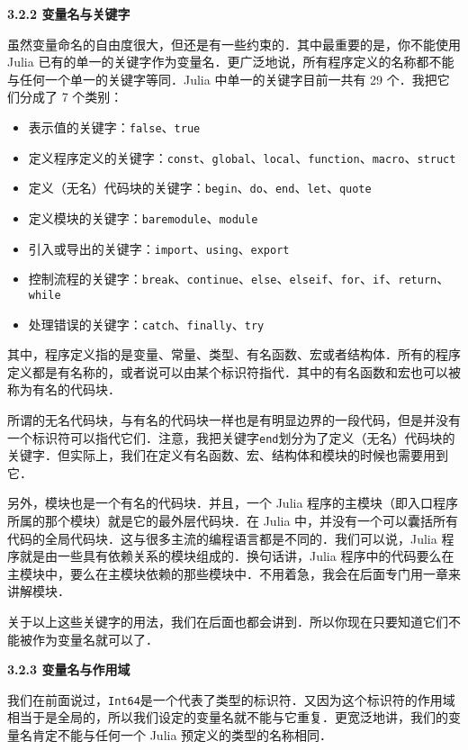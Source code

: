 \textbf{3.2.2 变量名与关键字}

虽然变量命名的自由度很大，但还是有一些约束的．其中最重要的是，你不能使用 Julia 已有的单一的关键字作为变量名．更广泛地说，所有程序定义的名称都不能与任何一个单一的关键字等同．Julia 中单一的关键字目前一共有 29 个．我把它们分成了 7 个类别：

\begin{itemize}
\item 表示值的关键字：\verb|false|、\verb|true|
\item 定义程序定义的关键字：\verb|const|、\verb|global|、\verb|local|、\verb|function|、\verb|macro|、\verb|struct|
\item 定义（无名）代码块的关键字：\verb|begin|、\verb|do|、\verb|end|、\verb|let|、\verb|quote|
\item 定义模块的关键字：\verb|baremodule|、\verb|module|
\item 引入或导出的关键字：\verb|import|、\verb|using|、\verb|export|
\item 控制流程的关键字：\verb|break|、\verb|continue|、\verb|else|、\verb|elseif|、\verb|for|、\verb|if|、\verb|return|、\verb|while|
\item 处理错误的关键字：\verb|catch|、\verb|finally|、\verb|try|
\end{itemize}

其中，程序定义指的是变量、常量、类型、有名函数、宏或者结构体．所有的程序定义都是有名称的，或者说可以由某个标识符指代．其中的有名函数和宏也可以被称为有名的代码块．

所谓的无名代码块，与有名的代码块一样也是有明显边界的一段代码，但是并没有一个标识符可以指代它们．注意，我把关键字\verb|end|划分为了定义（无名）代码块的关键字．但实际上，我们在定义有名函数、宏、结构体和模块的时候也需要用到它．

另外，模块也是一个有名的代码块．并且，一个 Julia 程序的主模块（即入口程序所属的那个模块）就是它的最外层代码块．在 Julia 中，并没有一个可以囊括所有代码的全局代码块．这与很多主流的编程语言都是不同的．我们可以说，Julia 程序就是由一些具有依赖关系的模块组成的．换句话讲，Julia 程序中的代码要么在主模块中，要么在主模块依赖的那些模块中．不用着急，我会在后面专门用一章来讲解模块．

关于以上这些关键字的用法，我们在后面也都会讲到．所以你现在只要知道它们不能被作为变量名就可以了．

\textbf{3.2.3 变量名与作用域}

我们在前面说过，\verb|Int64|是一个代表了类型的标识符．又因为这个标识符的作用域相当于是全局的，所以我们设定的变量名就不能与它重复．更宽泛地讲，我们的变量名肯定不能与任何一个 Julia 预定义的类型的名称相同．

